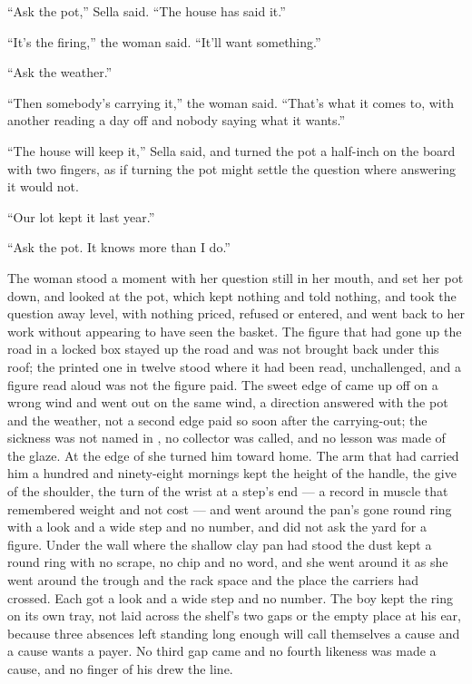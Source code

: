 “Ask the pot,” Sella said. “The house has said it.”

“It's the firing,” the woman said. “It'll want something.”

“Ask the weather.”

“Then somebody's carrying it,” the woman said. “That's what it comes to, with another reading a day off and nobody saying what it wants.”

“The house will keep it,” Sella said, and turned the pot a half-inch on the board with two fingers, as if turning the pot might settle the question where answering it would not.

“Our lot kept it last year.”

“Ask the pot. It knows more than I do.”

The woman stood a moment with her question still in her mouth, and set her pot down, and looked at the pot, which kept nothing and told nothing, and took the question away level, with nothing priced, refused or entered, and went back to her work without appearing to have seen the basket. The figure that had gone up the road in a locked box stayed up the road and was not brought back under this roof; the printed one in twelve stood where it had been read, unchallenged, and a figure read aloud was not the figure paid. The sweet edge of  came up off  on a wrong wind and went out on the same wind, a direction answered with the pot and the weather, not a second edge paid so soon after the carrying-out; the sickness was not named in , no collector was called, and no lesson was made of the glaze. At the edge of  she turned him toward home. The arm that had carried him a hundred and ninety-eight mornings kept the height of the handle, the give of the shoulder, the turn of the wrist at a step's end --- a record in muscle that remembered weight and not cost --- and went around the pan's gone round ring with a look and a wide step and no number, and did not ask the yard for a figure. Under the wall where the shallow clay pan had stood the dust kept a round ring with no scrape, no chip and no word, and she went around it as she went around the trough and the rack space and the place the carriers had crossed. Each got a look and a wide step and no number. The boy kept the ring on its own tray, not laid across the shelf's two gaps or the empty place at his ear, because three absences left standing long enough will call themselves a cause and a cause wants a payer. No third gap came and no fourth likeness was made a cause, and no finger of his drew the line.


